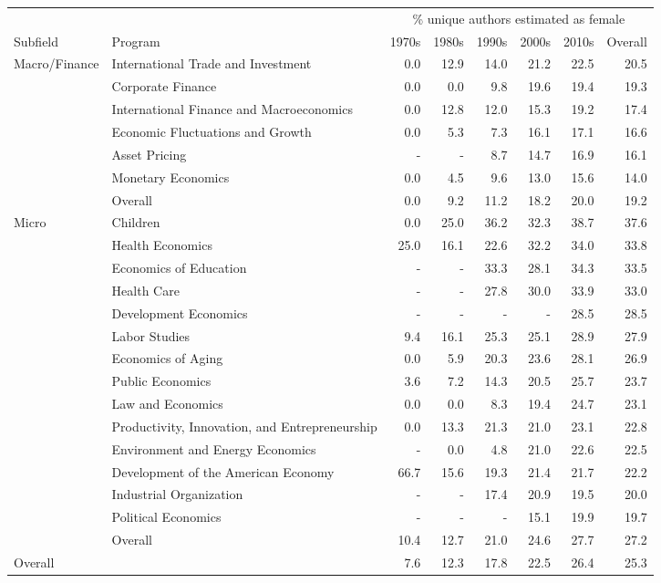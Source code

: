
\begin{tabular}{llrrrrrr}
\toprule
 & & \multicolumn{6}{c}{\% unique authors estimated as female}\\
\cmidrule(lr){3-8}
Subfield & Program & 1970s & 1980s & 1990s & 2000s & 2010s & Overall\\
\midrule
Macro/Finance & International Trade and Investment & 0.0 & 12.9 & 14.0 & 21.2 & 22.5 & 20.5\\
 & Corporate Finance & 0.0 & 0.0 & 9.8 & 19.6 & 19.4 & 19.3\\
 & International Finance and Macroeconomics & 0.0 & 12.8 & 12.0 & 15.3 & 19.2 & 17.4\\
 & Economic Fluctuations and Growth & 0.0 & 5.3 & 7.3 & 16.1 & 17.1 & 16.6\\
 & Asset Pricing & - & - & 8.7 & 14.7 & 16.9 & 16.1\\
 & Monetary Economics & 0.0 & 4.5 & 9.6 & 13.0 & 15.6 & 14.0\\
\cmidrule(lr){2-8}
 & Overall & 0.0 & 9.2 & 11.2 & 18.2 & 20.0 & 19.2\\
\midrule
Micro & Children & 0.0 & 25.0 & 36.2 & 32.3 & 38.7 & 37.6\\
 & Health Economics & 25.0 & 16.1 & 22.6 & 32.2 & 34.0 & 33.8\\
 & Economics of Education & - & - & 33.3 & 28.1 & 34.3 & 33.5\\
 & Health Care & - & - & 27.8 & 30.0 & 33.9 & 33.0\\
 & Development Economics & - & - & - & - & 28.5 & 28.5\\
 & Labor Studies & 9.4 & 16.1 & 25.3 & 25.1 & 28.9 & 27.9\\
 & Economics of Aging & 0.0 & 5.9 & 20.3 & 23.6 & 28.1 & 26.9\\
 & Public Economics & 3.6 & 7.2 & 14.3 & 20.5 & 25.7 & 23.7\\
 & Law and Economics & 0.0 & 0.0 & 8.3 & 19.4 & 24.7 & 23.1\\
 & Productivity, Innovation, and Entrepreneurship & 0.0 & 13.3 & 21.3 & 21.0 & 23.1 & 22.8\\
 & Environment and Energy Economics & - & 0.0 & 4.8 & 21.0 & 22.6 & 22.5\\
 & Development of the American Economy & 66.7 & 15.6 & 19.3 & 21.4 & 21.7 & 22.2\\
 & Industrial Organization & - & - & 17.4 & 20.9 & 19.5 & 20.0\\
 & Political Economics & - & - & - & 15.1 & 19.9 & 19.7\\
\cmidrule(lr){2-8}
 & Overall & 10.4 & 12.7 & 21.0 & 24.6 & 27.7 & 27.2\\
\midrule
Overall &  & 7.6 & 12.3 & 17.8 & 22.5 & 26.4 & 25.3\\
\bottomrule
\end{tabular}
